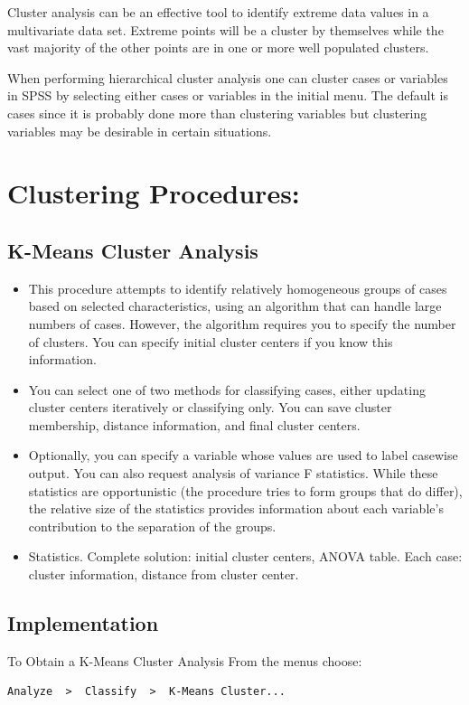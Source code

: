 \documentclass[a4paper,12pt]{article}
\begin{document}
Cluster analysis can be an effective tool to identify extreme data values in a multivariate data set.  Extreme points will be a cluster by themselves while the vast majority of the other points are in one or more well populated clusters.  

When performing hierarchical cluster analysis one can cluster cases or variables in SPSS by selecting either cases or variables in the initial menu.  The default is cases since it is probably done more than clustering variables but clustering variables may be desirable in certain situations.  

 
 \newpage
\section*{Clustering Procedures: }

\subsection*{K-Means Cluster Analysis}
\begin{itemize}
	\item This procedure attempts to identify relatively homogeneous groups of cases based on selected characteristics, using an algorithm that can handle large numbers of cases. However, the algorithm requires you to specify the number of clusters. You can specify initial cluster centers if you know this information. \item You can select one of two methods for classifying cases, either updating cluster centers iteratively or classifying only. You can save cluster membership, distance information, and final cluster centers. \item Optionally, you can specify a variable whose values are used to label casewise output. You can also request analysis of variance F statistics. While these statistics are opportunistic (the procedure tries to form groups that do differ), the relative size of the statistics provides information about each variable's contribution to the separation of the groups.
	
	\item Statistics. Complete solution: initial cluster centers, ANOVA table.  Each case: cluster information, distance from cluster center.
\end{itemize}




\subsection*{Implementation}
To Obtain a K-Means Cluster Analysis
From the menus choose:
\begin{verbatim}
Analyze  >  Classify  >  K-Means Cluster...    
\end{verbatim}
\end{document}
